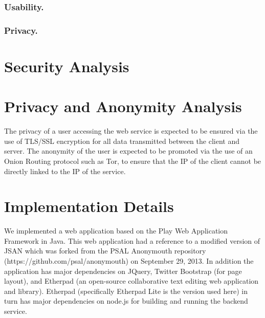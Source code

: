 \documentclass[letterpaper]{article}
\begin{document}
\subsubsection{Usability.}

\subsubsection{Privacy.}


\section{Security Analysis}

\section{Privacy and Anonymity Analysis}

The privacy of a user accessing the web service is expected to be
ensured via the use of TLS/SSL encryption for all data transmitted
between the client and server. The anonymity of the user is expected
to be promoted via the use of an Onion Routing protocol such as Tor,
to ensure that the IP of the client cannot be directly linked to the
IP of the service.

\section{Implementation Details}

We implemented a web application based on the Play Web Application
Framework in Java. This web application had a reference to a modified
version of JSAN which was forked from the PSAL Anonymouth repository
(https://github.com/psal/anonymouth) on September 29, 2013. In
addition the application has major dependencies on JQuery, Twitter
Bootstrap (for page layout), and Etherpad  (an open-source collaborative text editing
web application and library). Etherpad (specifically Etherpad Lite is
the version used here) in turn has major dependencies on
node.js for building and running the backend service.
\end{document}
